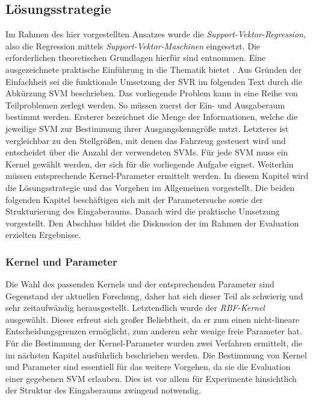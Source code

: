 \subsection{Lösungsstrategie}
\label{subsec:Lösungsstrategie}
Im Rahmen des hier vorgestellten Ansatzes wurde die \textit{Support-Vektor-Regression}, also die Regression mittels \textit{Support-Vektor-Maschinen} eingesetzt. Die erforderlichen theoretischen Grundlagen hierfür sind \cite{BenHur2008} entnommen. Eine ausgezeichnete praktische Einführung in die Thematik bietet \cite{HsuLibsvmTutorial2003}. Aus Gründen der Einfachheit sei die funktionale Umsetzung der SVR im folgenden Text durch die Abkürzung SVM beschrieben.
Das vorliegende Problem kann in eine Reihe von Teilproblemen zerlegt werden. So müssen zuerst der Ein- und Ausgaberaum bestimmt werden. Ersterer bezeichnet die Menge der Informationen, welche die jeweilige SVM zur Bestimmung ihrer Ausgangskenngröße nutzt. Letzteres ist vergleichbar zu den Stellgrößen, mit denen das Fahrzeug gesteuert wird und entscheidet über die Anzahl der verwendeten SVMs. Für jede SVM muss ein Kernel gewählt werden, der sich für die vorliegende Aufgabe eignet. Weiterhin müssen entsprechende Kernel-Parameter ermittelt werden.
In diesem Kapitel wird die Lösungsstrategie und das Vorgehen im Allgemeinen vorgestellt. Die beiden folgenden Kapitel beschäftigen sich mit der Parametersuche sowie der Strukturierung des Eingaberaums. Danach wird die praktische Umsetzung vorgestellt. Den Abschluss bildet die Diskussion der im Rahmen der Evaluation erzielten Ergebnisse.

\subsubsection{Kernel und Parameter}
\label{subsubsec:KernelUndParameter}
Die Wahl des passenden Kernels und der entsprechenden Parameter sind Gegenstand der aktuellen Forschung, daher hat sich dieser Teil als schwierig und sehr zeitaufwändig herausgestellt. Letztendlich wurde der \textit{RBF-Kernel} ausgewählt. Dieser erfreut sich großer Beliebtheit, da er zum einen nicht-lineare Entscheidungsgrenzen ermöglicht, zum anderen sehr wenige freie Parameter hat.
Für die Bestimmung der Kernel-Parameter wurden zwei Verfahren ermittelt, die im nächsten Kapitel ausführlich beschrieben werden. Die Bestimmung von Kernel und Parameter sind essentiell für das weitere Vorgehen, da sie die Evaluation einer gegebenen SVM erlauben. Dies ist vor allem für Experimente hinsichtlich der Struktur des Eingaberaums zwingend notwendig.

